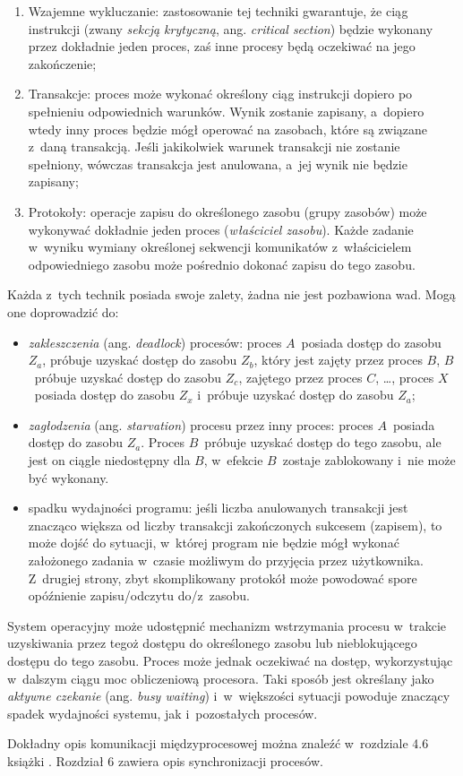 \documentclass[12pt]{mwart}
\begin{document}
  \begin{enumerate}
    \item Wzajemne wykluczanie: zastosowanie tej techniki gwarantuje, że ciąg instrukcji (zwany \emph{sekcją krytyczną}, ang. \emph{critical section})
      będzie wykonany przez dokładnie jeden proces, zaś inne procesy będą oczekiwać na jego zakończenie;
    \item Transakcje: proces może wykonać określony ciąg instrukcji dopiero po spełnieniu odpowiednich warunków. Wynik zostanie zapisany, a~dopiero wtedy inny proces będzie mógł operować na
      zasobach, które są związane z~daną transakcją. Jeśli jakikolwiek warunek transakcji nie zostanie spełniony, wówczas transakcja jest anulowana, a~jej wynik nie będzie zapisany;
    \item Protokoły: operacje zapisu do określonego zasobu (grupy zasobów) może wykonywać dokładnie jeden proces (\emph{właściciel zasobu}). 
      Każde zadanie w~wyniku wymiany określonej sekwencji komunikatów z~właścicielem odpowiedniego zasobu może pośrednio dokonać zapisu do tego zasobu.
  \end{enumerate}
  Każda z~tych technik posiada swoje zalety, żadna nie jest pozbawiona wad. Mogą one doprowadzić do:
  \begin{itemize}
    \item \emph{zakleszczenia} (ang. \emph{deadlock}) procesów: proces $A$~posiada dostęp do zasobu $Z_a$, próbuje uzyskać dostęp do zasobu $Z_b$, który jest zajęty przez proces $B$,
      $B$~próbuje uzyskać dostęp do zasobu $Z_c$, zajętego przez proces $C$, \ldots, proces $X$~posiada dostęp do zasobu $Z_x$ i~próbuje uzyskać dostęp do zasobu $Z_a$;
    \item \emph{zagłodzenia} (ang. \emph{starvation}) procesu przez inny proces: proces $A$~posiada dostęp do zasobu $Z_a$. Proces $B$~próbuje uzyskać dostęp do tego zasobu, ale jest on
      ciągle niedostępny dla $B$, w~efekcie $B$~zostaje zablokowany i~nie może być wykonany.
    \item spadku wydajności programu: jeśli liczba anulowanych transakcji jest znacząco większa od liczby transakcji zakończonych sukcesem (zapisem), to może dojść do sytuacji, w~której
      program nie będzie mógł wykonać założonego zadania w~czasie możliwym do przyjęcia przez użytkownika. Z~drugiej strony, zbyt skomplikowany protokół może powodować spore opóźnienie
      zapisu/odczytu do/z~zasobu.
  \end{itemize}
\par
%
\indent
  System operacyjny może udostępnić mechanizm wstrzymania procesu w~trakcie uzyskiwania przez tegoż dostępu do określonego zasobu lub nieblokującego dostępu do tego zasobu.
  Proces może jednak oczekiwać na dostęp, wykorzystując w~dalszym ciągu moc obliczeniową procesora. Taki sposób jest określany jako \emph{aktywne czekanie} (ang. \emph{busy waiting})
  i~w~większości sytuacji powoduje znaczący spadek wydajności systemu, jak i~pozostałych procesów.
\par
%
\indent
  Dokładny opis komunikacji międzyprocesowej  można znaleźć w~rozdziale 4.6 książki \cite{silberschatz}. Rozdział 6 zawiera opis synchronizacji procesów.
\par
%
\newpage
\end{document}
